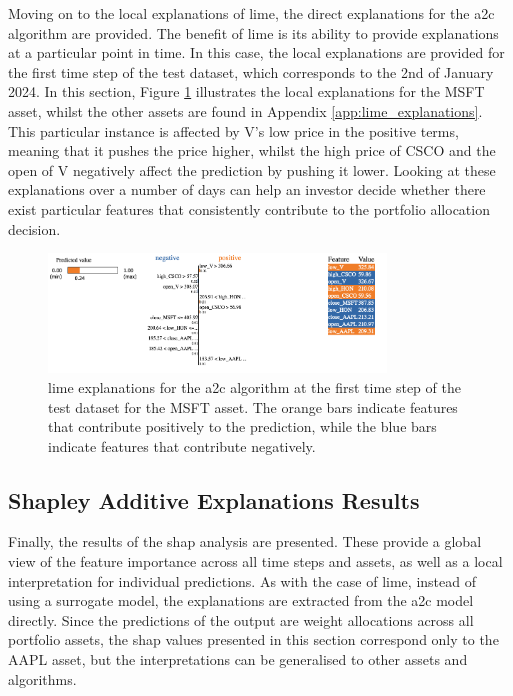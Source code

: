 Moving on to the local explanations of \acrshort{lime}, the direct explanations for the \acrshort{a2c} algorithm are provided. The benefit of \acrshort{lime} is its ability to provide explanations at a particular point in time. In this case, the local explanations are provided for the first time step of the test dataset, which corresponds to the 2nd of January 2024. In this section, Figure \ref{fig:a2c_lime_msft} illustrates the local explanations for the MSFT asset, whilst the other assets are found in Appendix \ref{app:lime_explanations}. This particular instance is affected by V's low price in the positive terms, meaning that it pushes the price higher, whilst the high price of CSCO and the open of V negatively affect the prediction by pushing it lower. Looking at these explanations over a number of days can help an investor decide whether there exist particular features that consistently contribute to the portfolio allocation decision.

\begin{figure}
    \centering
    \includegraphics[width=0.8\textwidth]{figures/a2c_lime_msft.png}
    \caption{\acrshort{lime} explanations for the \acrshort{a2c} algorithm at the first time step of the test dataset for the MSFT asset. The orange bars indicate features that contribute positively to the prediction, while the blue bars indicate features that contribute negatively.}
    \label{fig:a2c_lime_msft}
\end{figure}

\subsection{Shapley Additive Explanations Results} \label{sec:shap-results}

Finally, the results of the \acrshort{shap} analysis are presented. These provide a global view of the feature importance across all time steps and assets, as well as a local interpretation for individual predictions. As with the case of \acrshort{lime}, instead of using a surrogate model, the explanations are extracted from the \acrshort{a2c} model directly. Since the predictions of the output are weight allocations across all portfolio assets, the \acrshort{shap} values presented in this section correspond only to the AAPL asset, but the interpretations can be generalised to other assets and algorithms.

